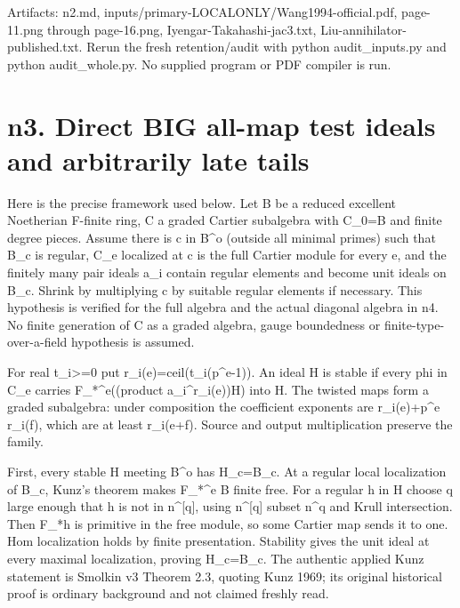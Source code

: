 \documentclass[11pt]{article}
\begin{document}
Artifacts: n2.md, inputs/primary-LOCALONLY/Wang1994-official.pdf, page-11.png through page-16.png, Iyengar-Takahashi-jac3.txt, Liu-annihilator-published.txt. Rerun the fresh retention/audit with python audit\_inputs.py and python audit\_whole.py. No supplied program or PDF compiler is run.

\section{n3. Direct BIG all-map test ideals and arbitrarily late tails}

Here is the precise framework used below. Let B be a reduced excellent Noetherian F-finite ring, C a graded Cartier subalgebra with C\_0=B and finite degree pieces. Assume there is c in B\textasciicircum{}o (outside all minimal primes) such that B\_c is regular, C\_e localized at c is the full Cartier module for every e, and the finitely many pair ideals a\_i contain regular elements and become unit ideals on B\_c. Shrink by multiplying c by suitable regular elements if necessary. This hypothesis is verified for the full algebra and the actual diagonal algebra in n4. No finite generation of C as a graded algebra, gauge boundedness or finite-type-over-a-field hypothesis is assumed.

For real t\_i>=0 put r\_i(e)=ceil(t\_i(p\textasciicircum{}e-1)). An ideal H is stable if every phi in C\_e carries F\_*\textasciicircum{}e((product a\_i\textasciicircum{}r\_i(e))H) into H. The twisted maps form a graded subalgebra: under composition the coefficient exponents are r\_i(e)+p\textasciicircum{}e r\_i(f), which are at least r\_i(e+f). Source and output multiplication preserve the family.

First, every stable H meeting B\textasciicircum{}o has H\_c=B\_c. At a regular local localization of B\_c, Kunz's theorem makes F\_*\textasciicircum{}e B finite free. For a regular h in H choose q large enough that h is not in n\textasciicircum{}[q], using n\textasciicircum{}[q] subset n\textasciicircum{}q and Krull intersection. Then F\_*h is primitive in the free module, so some Cartier map sends it to one. Hom localization holds by finite presentation. Stability gives the unit ideal at every maximal localization, proving H\_c=B\_c. The authentic applied Kunz statement is Smolkin v3 Theorem 2.3, quoting Kunz 1969; its original historical proof is ordinary background and not claimed freshly read.
\end{document}
